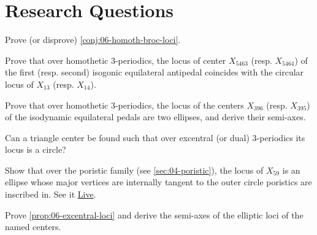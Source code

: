 \section{Research Questions}

\begin{question}
Prove (or disprove) \cref{conj:06-homoth-broc-loci}.
\end{question}

\begin{question}
Prove that over homothetic 3-periodics, the locus of center $X_{5463}$ (resp. $X_{5464}$) of the first (resp. second) isogonic equilateral antipedal coincides with the circular locus of $X_{13}$ (resp. $X_{14}$).
\end{question}

\begin{question}
Prove that over homothetic 3-periodics, the locus of the centers $X_{396}$ (resp. $X_{395}$) of the isodynamic equilateral pedals are two ellipses, and derive their semi-axes.
\end{question}

\begin{question}
Can a triangle center be found such that over excentral (or dual) 3-periodics its locus is a circle? 
\end{question}

\begin{question}
Show that over the poristic family (see \cref{sec:04-poristic}), the locus of $X_{59}$ is an ellipse whose major vertices are internally tangent to the outer circle poristics are inscribed in. See it \href{https://bit.ly/2R5laS4}{Live}.
\end{question}

\begin{question}
Prove \cref{prop:06-excentral-loci} and derive the semi-axes of the elliptic loci of the named centers.
\end{question}